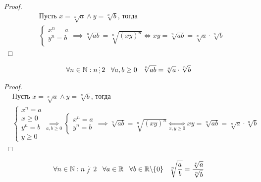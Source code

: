 \begin{proof}
    \hfill
    \begin{align*}
        &\text{Пусть } x = \sqrt[n]{a} \land y = \sqrt[n]{b} \text{, тогда}\\
        &\left\{\begin{array}{l}
            x^n = a \\
            y^n = b \\
        \end{array}\right. \implies
        \sqrt[n]{ab} = \sqrt[n]{(xy)^n} \iff
        xy = \sqrt[n]{ab} = \sqrt[n]{a} \cdot \sqrt[n]{b}
    \end{align*}
\end{proof}

\break

\begin{theorem}
    \begin{align*}
        \forall n \in \mathbb{N}: n \divisible 2 \;\;\; \forall a, b \ge 0 \;\;\; \sqrt[n]{ab} = \sqrt[n]{a} \cdot \sqrt[n]{b}
    \end{align*}
\end{theorem}

\begin{proof}
    \hfill
    \begin{align*}
        &\text{Пусть } x = \sqrt[n]{a} \land y = \sqrt[n]{b} \text{, тогда}\\
        &\left\{\begin{array}{l}
            x^n = a \\
            x \ge 0 \\
            y^n = b \\
            y \ge 0
        \end{array}\right. \underset{a, b \ge 0}{\implies}
        \left\{\begin{array}{l}
            x^n = a \\
            y^n = b
        \end{array}\right. \implies
        \sqrt[n]{ab} = \sqrt[n]{(xy)^n} \underset{x, y \ge 0}{\iff}
        xy = \sqrt[n]{ab} = \sqrt[n]{a} \cdot \sqrt[n]{b}
    \end{align*}
\end{proof}

\begin{theorem}
    \begin{align*}
        \forall n \in \mathbb{N}: n \notdivisible 2 \;\;\; \forall a \in \mathbb{R} \;\;\; \forall b \in \mathbb{R} \backslash \{0\} \;\;\; \sqrt[n]{\frac{a}{b}} = \frac{\sqrt[n]{a}}{\sqrt[n]{b}}
    \end{align*}
\end{theorem}

